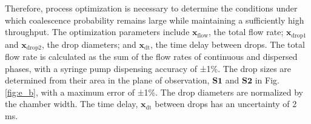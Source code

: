 \documentclass[twoside,twocolumn,9pt]{article}
\begin{document}

Therefore, process optimization is necessary to determine the conditions under which coalescence probability remains large while maintaining a sufficiently high throughput. The optimization parameters include $\mathbf{x}_\textrm{flow}$, the total flow rate; $\mathbf{x}_\textrm{drop1}$ and $\mathbf{x}_\textrm{drop2}$, the drop diameters; and $\mathbf{x}_\textrm{dt}$, the time delay between drops. The total flow rate is calculated as the sum of the flow rates of continuous and dispersed phases, with a syringe pump dispensing accuracy of ±1\%. The drop sizes are determined from their area in the plane of observation, $\mathbf{S1}$ and $\mathbf{S2}$ in Fig.\ref{fig:e_b}, with a maximum error of ±1\%. The drop diameters are normalized by the chamber width. The time delay, $\mathbf{x}_\textrm{dt}$ between drops has an uncertainty of 2 ms.

\end{document}
